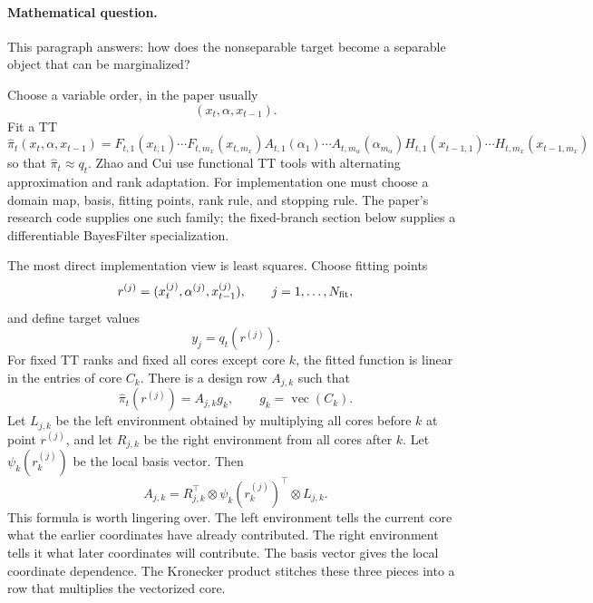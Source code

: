 \documentclass[11pt]{article}
\numberwithin{equation}{section}
\newcommand{\vecop}{\operatorname{vec}}
\begin{document}
\paragraph{Mathematical question.}
This paragraph answers: how does the nonseparable target become a separable
object that can be marginalized?

Choose a variable order, in the paper usually
\[
    (x_t,\alpha,x_{t-1}).
\]
Fit a TT
\begin{equation}
    \widehat\pi_t(x_t,\alpha,x_{t-1})
    =
    F_{t,1}(x_{t,1})\cdots F_{t,m_x}(x_{t,m_x})
    A_{t,1}(\alpha_1)\cdots A_{t,m_\alpha}(\alpha_{m_\alpha})
    H_{t,1}(x_{t-1,1})\cdots H_{t,m_x}(x_{t-1,m_x})
    \label{eq:p24-a1-2}
\end{equation}
so that \(\widehat\pi_t\approx q_t\).  Zhao and Cui \cite{zhao2024ttsequential} use functional TT tools with
alternating approximation and rank adaptation.  For implementation one must
choose a domain map, basis, fitting points, rank rule, and stopping rule.  The
paper's research code supplies one such family; the fixed-branch section below
supplies a differentiable BayesFilter specialization.

The most direct implementation view is least squares.  Choose fitting points
\[
    r^{(j)}=(x_t^{(j)},\alpha^{(j)},x_{t-1}^{(j)}),
    \qquad j=1,\ldots,N_{\rm fit},
\]
and define target values
\[
    y_j=q_t(r^{(j)}).
\]
For fixed TT ranks and fixed all cores except core \(k\), the fitted function is
linear in the entries of core \(C_k\).  There is a design row \(A_{j,k}\) such
that
\begin{equation}
    \widehat\pi_t(r^{(j)})=A_{j,k}g_k,
    \qquad g_k=\vecop(C_k).
    \label{eq:p24-a1-2a}
\end{equation}
Let \(L_{j,k}\) be the left environment obtained by multiplying all cores before
\(k\) at point \(r^{(j)}\), and let \(R_{j,k}\) be the right environment from
all cores after \(k\).  Let
\(\psi_k(r_k^{(j)})\) be the local basis vector.  Then
\begin{equation}
    A_{j,k}
    =
    R_{j,k}^{\top}\otimes \psi_k(r_k^{(j)})^\top\otimes L_{j,k}.
    \label{eq:p24-a1-2b}
\end{equation}
This formula is worth lingering over.  The left environment tells the current
core what the earlier coordinates have already contributed.  The right
environment tells it what later coordinates will contribute.  The basis vector
gives the local coordinate dependence.  The Kronecker product stitches these
three pieces into a row that multiplies the vectorized core.
\end{document}
